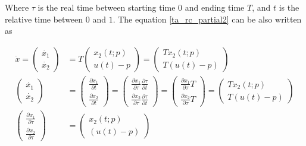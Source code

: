 Where $\tau$ is the real time between starting time $0$ and ending time $T$, and $t$ is the relative time between $0$ and $1$.  The equation \ref{ta_rc_partial2} can be also written as 

\begin{subequations}
		\begin{align}
 \dot{x} =  \begin{pmatrix} \dot{x_1} \\ \dot{x_2} \end{pmatrix}  & =  T  \begin{pmatrix}  x_2(t;p) \\ u(t)-p   \end{pmatrix} = \begin{pmatrix}  Tx_2(t;p) \\ T(u(t)-p)   \end{pmatrix} \label{eq_difT} \\ 
 \begin{pmatrix} \dot{x_1} \\ \dot{x_2} \end{pmatrix} &= \begin{pmatrix} \frac{\partial x_1}{\partial t} \\ \frac{\partial x_2}{\partial t} \end{pmatrix} = \begin{pmatrix} \frac{\partial x_1}{\partial \tau} \frac{\partial \tau}{\partial t} \\ \frac{\partial x_2}{\partial \tau} \frac{\partial \tau}{\partial t} \end{pmatrix} =  \begin{pmatrix} \frac{\partial x_1}{\partial \tau} T \\ \frac{\partial x_2}{\partial \tau}T \end{pmatrix} =     \begin{pmatrix}  Tx_2(t;p) \\ T(u(t)-p)   \end{pmatrix} \\
 \begin{pmatrix} \frac{\partial x_1}{\partial \tau}  \\ \frac{\partial x_2}{\partial \tau} \end{pmatrix} & =     \begin{pmatrix}  x_2(t;p) \\ (u(t)-p)   \end{pmatrix} \label{eq_difTau}
 	\end{align}
 \end{subequations}

